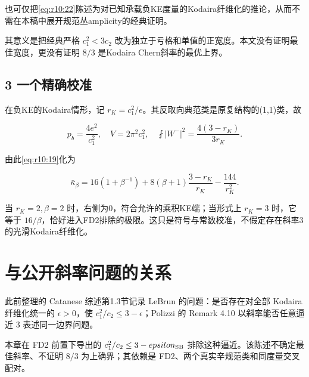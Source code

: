 \documentclass[UTF8,11pt,fontset=none]{ctexart}
\begin{document}
也可仅把\eqref{eq:r10:22}陈述为对已知承载负KE度量的Kodaira纤维化的推论，从而不需在本稿中展开规范丛amplicity的经典证明。

其意义是把经典严格 \(c_1^2<3c_2\) 改为独立于亏格和单值的正宽度。本文没有证明最佳宽度，更没有证明 \(8/3\) 是Kodaira Chern斜率的最优上界。

\subsection{3 一个精确校准}\label{ch10:ux4e00ux4e2aux7cbeux786eux6821ux51c6}

在负KE的Kodaira情形，记 \(r_K=c_1^2/e\)。其反取向典范类是原复结构的(1,1)类，故

\[
p_b=\frac{4e^2}{c_1^2},\quad
V=2\pi^2 c_1^2,\quad
\fint|W^-|^2=\frac{4(3-r_K)}{3r_K}.
\]

由此\eqref{eq:r10:19}化为

\[
\bar\kappa_\beta
=16(1+\beta^{-1})
+8(\beta+1)\frac{3-r_K}{r_K}
-\frac{144}{r_K^2}.
\tag{10.23}\label{eq:r10:23}
\]

当 \(r_K=2,\beta=2\) 时，右侧为0，符合允许的乘积KE端；当形式上 \(r_K=3\) 时，它等于 \(16/\beta\)，恰好进入FD2排除的极限。这只是符号与常数校准，不假定存在斜率3的光滑Kodaira纤维化。

\section{与公开斜率问题的关系}\label{ch10:ux4e0eux516cux5f00ux659cux7387ux95eeux9898ux7684ux5173ux7cfb}

此前整理的 Catanese 综述第1.3节记录 LeBrun 的问题：是否存在对全部 Kodaira 纤维化统一的 \(\epsilon>0\)，使 \(c_1^2/c_2\le3-\epsilon\)；Polizzi 的 Remark 4.10 以斜率能否任意逼近 \(3\) 表述同一边界问题。\cite{Catanese2016,Polizzi2022}

本章在 FD2 前置下导出的 \(c_1^2/c_2\le3-\varepsilon_{\rm SB}\) 排除这种逼近。该陈述不确定最佳斜率、不证明 \(8/3\) 为上确界；其依赖是 FD2、两个真实辛规范类和同度量交叉配对。
\end{document}
